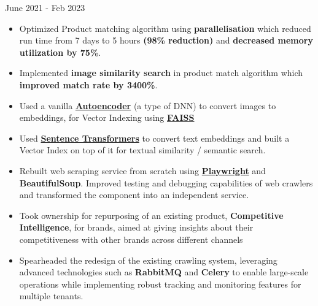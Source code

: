 \documentclass[a4paper]{MagicalCV}
\begin{document}
\begin{minipage}[t]{0.5\textwidth}
\begin{cventries}
  \cventry
    {} %
    {} %
    {} %
    {June 2021 - Feb 2023} %
    {
        \vspace*{-\baselineskip}
        \item \hspace{2pt} 
        \begin{itemize}[leftmargin=6mm]
            \item {Optimized Product matching algorithm using \textbf{parallelisation} which reduced run time from 7 days to 5 hours \textbf{(98\% reduction)} and \textbf{decreased memory utilization by 75\%}.}
            \item {Implemented \textbf{image similarity search} in product match algorithm which \textbf{improved match rate by 3400\%}.}
            \item Used a vanilla \href{https://en.wikipedia.org/wiki/Autoencoder}{\textbf{Autoencoder}} (a type of DNN) to convert images to embeddings, for Vector Indexing using \href{https://faiss.ai/index.html}{\textbf{FAISS}}
            \item Used \href{https://www.sbert.net/}{\textbf{Sentence Transformers}} to convert text embeddings and built a Vector Index on top of it for textual similarity / semantic search.
        \end{itemize}
        \vspace{4pt}
        \item \hspace{2pt} 
        \begin{itemize}[leftmargin=6mm]
            \item {Rebuilt web scraping service from scratch using \href{https://playwright.dev/}{\textbf{Playwright}} and \textbf{BeautifulSoup}. Improved testing and debugging capabilities of web crawlers and transformed the component into an independent service.}
        \end{itemize}
        \vspace{4pt}
        \item \hspace{2pt} 
        \begin{itemize}[leftmargin=6mm]
            \item {Took ownership for repurposing of an existing product, \textbf{Competitive Intelligence}, for brands, aimed at giving insights about their competitiveness with other brands across different channels}
            \item {Spearheaded the redesign of the existing crawling system, leveraging advanced technologies such as \textbf{RabbitMQ} and \textbf{Celery} to enable large-scale operations while implementing robust tracking and monitoring features for multiple tenants.}
        \end{itemize}
    }

\end{cventries}
\end{minipage} 
\end{document}
